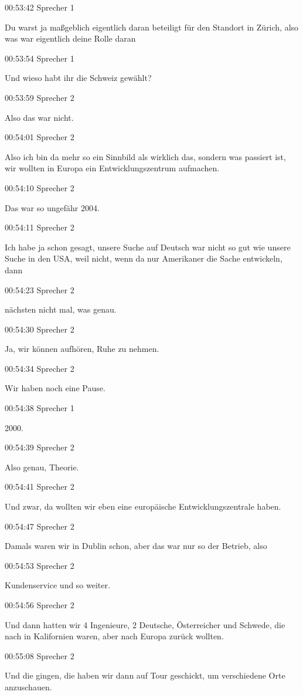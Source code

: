 00:53:42 Sprecher 1

Du warst ja maßgeblich eigentlich daran beteiligt für den Standort in
Zürich, also was war eigentlich deine Rolle daran

00:53:54 Sprecher 1

Und wieso habt ihr die Schweiz gewählt?

00:53:59 Sprecher 2

Also das war nicht.

00:54:01 Sprecher 2

Also ich bin da mehr so ein Sinnbild als wirklich das, sondern was
passiert ist, wir wollten in Europa ein Entwicklungszentrum aufmachen.

00:54:10 Sprecher 2

Das war so ungefähr 2004.

00:54:11 Sprecher 2

Ich habe ja schon gesagt, unsere Suche auf Deutsch war nicht so gut wie
unsere Suche in den USA, weil nicht, wenn da nur Amerikaner die Sache
entwickeln, dann

00:54:23 Sprecher 2

nächsten nicht mal, was genau.

00:54:30 Sprecher 2

Ja, wir können aufhören, Ruhe zu nehmen.

00:54:34 Sprecher 2

Wir haben noch eine Pause.

00:54:38 Sprecher 1

2000.

00:54:39 Sprecher 2

Also genau, Theorie.

00:54:41 Sprecher 2

Und zwar, da wollten wir eben eine europäische Entwicklungszentrale
haben.

00:54:47 Sprecher 2

Damals waren wir in Dublin schon, aber das war nur so der Betrieb, also

00:54:53 Sprecher 2

Kundenservice und so weiter.

00:54:56 Sprecher 2

Und dann hatten wir 4 Ingenieure, 2 Deutsche, Österreicher und Schwede,
die nach in Kalifornien waren, aber nach Europa zurück wollten.

00:55:08 Sprecher 2

Und die gingen, die haben wir dann auf Tour geschickt, um verschiedene
Orte anzuschauen.


